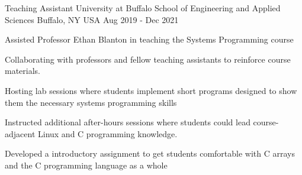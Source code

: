 \begin{cventries}
  \cventry
    {Teaching Assistant} %
    {University at Buffalo School of Engineering and Applied Sciences} %
    {Buffalo, NY USA} %
    {Aug 2019 - Dec 2021} %
    {
      \begin{cvitems} %
        \item Assisted Professor Ethan Blanton in teaching the Systems Programming course
        \item Collaborating with professors and fellow teaching assistants to reinforce course materials.
        \item Hosting lab sessions where students implement short programs designed to show them the necessary systems programming skills
        \item Instructed additional after-hours sessions where students could lead course-adjacent Linux and C programming knowledge.
        \item Developed a introductory assignment to get students comfortable with C arrays and the C programming language as a whole
      \end{cvitems}
    }

\end{cventries}
